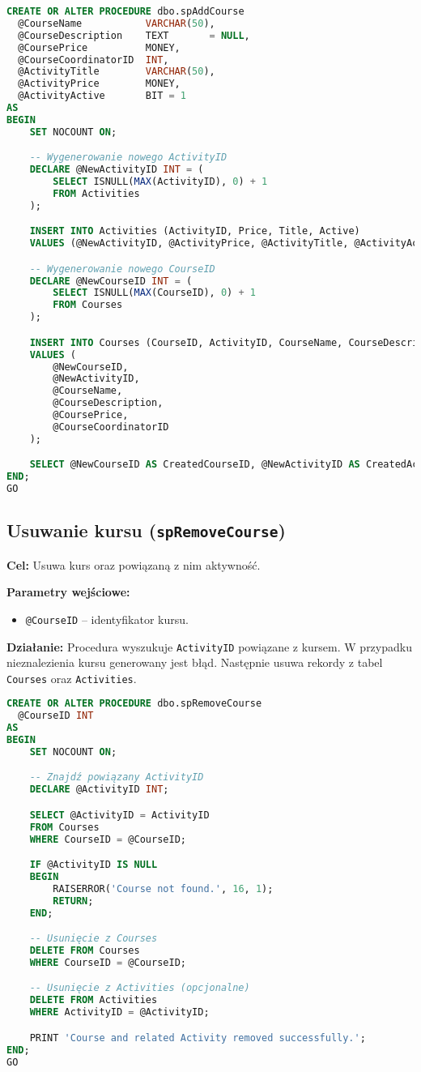 \documentclass[12pt]{article}
\begin{document}
\begin{lstlisting}[language=SQL]
CREATE OR ALTER PROCEDURE dbo.spAddCourse
  @CourseName           VARCHAR(50),
  @CourseDescription    TEXT       = NULL,
  @CoursePrice          MONEY,
  @CourseCoordinatorID  INT,
  @ActivityTitle        VARCHAR(50),
  @ActivityPrice        MONEY,
  @ActivityActive       BIT = 1
AS
BEGIN
    SET NOCOUNT ON;

    -- Wygenerowanie nowego ActivityID
    DECLARE @NewActivityID INT = (
        SELECT ISNULL(MAX(ActivityID), 0) + 1 
        FROM Activities
    );

    INSERT INTO Activities (ActivityID, Price, Title, Active)
    VALUES (@NewActivityID, @ActivityPrice, @ActivityTitle, @ActivityActive);

    -- Wygenerowanie nowego CourseID
    DECLARE @NewCourseID INT = (
        SELECT ISNULL(MAX(CourseID), 0) + 1
        FROM Courses
    );

    INSERT INTO Courses (CourseID, ActivityID, CourseName, CourseDescription, CoursePrice, CourseCoordinatorID)
    VALUES (
        @NewCourseID,
        @NewActivityID,
        @CourseName,
        @CourseDescription,
        @CoursePrice,
        @CourseCoordinatorID
    );

    SELECT @NewCourseID AS CreatedCourseID, @NewActivityID AS CreatedActivityID;
END;
GO
\end{lstlisting}

\subsection{Usuwanie kursu (\texttt{spRemoveCourse})}
\textbf{Cel:} Usuwa kurs oraz powiązaną z nim aktywność.

\textbf{Parametry wejściowe:}
\begin{itemize}
  \item \texttt{@CourseID} – identyfikator kursu.
\end{itemize}

\textbf{Działanie:} Procedura wyszukuje \verb|ActivityID| powiązane z kursem. W przypadku nieznalezienia kursu generowany jest błąd. Następnie usuwa rekordy z tabel \verb|Courses| oraz \verb|Activities|.

\begin{lstlisting}[language=SQL]
CREATE OR ALTER PROCEDURE dbo.spRemoveCourse
  @CourseID INT
AS
BEGIN
    SET NOCOUNT ON;

    -- Znajdź powiązany ActivityID
    DECLARE @ActivityID INT;

    SELECT @ActivityID = ActivityID
    FROM Courses
    WHERE CourseID = @CourseID;

    IF @ActivityID IS NULL
    BEGIN
        RAISERROR('Course not found.', 16, 1);
        RETURN;
    END;

    -- Usunięcie z Courses
    DELETE FROM Courses
    WHERE CourseID = @CourseID;

    -- Usunięcie z Activities (opcjonalne)
    DELETE FROM Activities
    WHERE ActivityID = @ActivityID;

    PRINT 'Course and related Activity removed successfully.';
END;
GO
\end{lstlisting}
\end{document}
